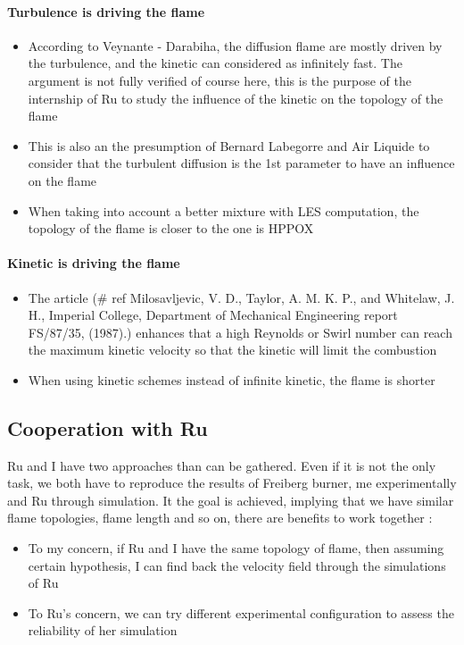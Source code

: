 \paragraph{Turbulence is driving the flame}
\begin{itemize}

\item According to Veynante - Darabiha, the diffusion flame are mostly driven by the turbulence, and the kinetic can considered as infinitely fast. The argument is not fully verified of course here, this is the purpose of the internship of Ru to study the influence of the kinetic on the topology of the flame
\item This is also an the presumption of Bernard Labegorre and Air Liquide to consider that the turbulent diffusion is the 1st parameter to have an influence on the flame
\item When taking into account a better mixture with LES computation, the topology of the flame is closer to the one is HPPOX

\end{itemize}
\paragraph{Kinetic is driving the flame}
\begin{itemize}
\item The article (\# ref Milosavljevic, V. D., Taylor, A. M. K. P., and
Whitelaw, J. H., Imperial College, Department of
Mechanical Engineering report FS/87/35, (1987).) enhances that a high Reynolds or Swirl number can reach the maximum kinetic velocity so that the kinetic will limit the combustion
\item When using kinetic schemes instead of infinite kinetic, the flame is shorter
\end{itemize}

\subsection{Cooperation with Ru}

Ru and I have two approaches than can be gathered. Even if it is not the only task, we both have to reproduce the results of Freiberg burner, me experimentally and Ru through simulation. It the goal is achieved, implying that we have similar flame topologies, flame length and so on, there are benefits to work together :
\begin{itemize}
\item To my concern, if Ru and I have the same topology of flame, then assuming certain hypothesis, I can find back the velocity field through the simulations of Ru
\item To Ru's concern, we can try different experimental configuration to assess the reliability of her simulation
\end{itemize}

